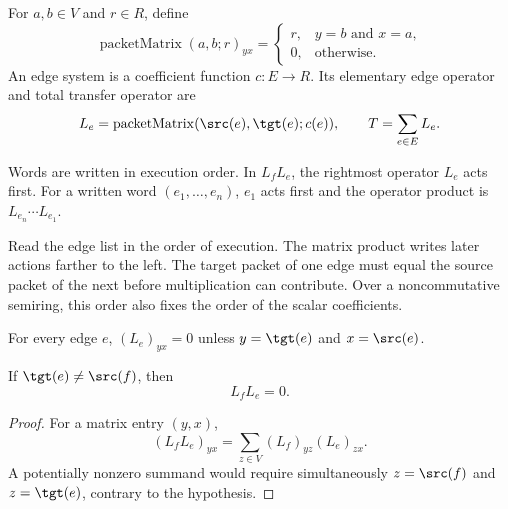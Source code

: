 \begin{definition}
\label{def:edge-system}
For $a,b\in V$ and $r\in R$, define
\[
  \operatorname{packetMatrix}(a,b;r)_{yx}
  =
  \begin{cases}
  r,&y=b\text{ and }x=a,\\
  0,&\text{otherwise}.
  \end{cases}
\]
An edge system is a coefficient function $c:E\to R$.  Its elementary edge
operator and total transfer operator are
\[
  L_e=\operatorname{packetMatrix}(\src(e),\tgt(e);c(e)),
  \qquad
  T=\sum_{e\in E}L_e.
\]
\end{definition}

Words are written in execution order. In $L_fL_e$, the rightmost operator
$L_e$ acts first. For a written word $(e_1,\ldots,e_n)$, $e_1$ acts first
and the operator product is $L_{e_n}\cdots L_{e_1}$.

\begin{keyidea}[title={Reading the execution order}]
Read the edge list in the order of execution. The matrix product writes later
actions farther to the left. The target packet of one edge must equal the
source packet of the next before multiplication can contribute. Over a noncommutative
semiring, this order also fixes the order of the scalar coefficients.
\end{keyidea}

\begin{lemma}
\label{lem:edge-support}
For every edge $e$, $(L_e)_{yx}=0$ unless
$y=\tgt(e)$ and $x=\src(e)$.
\end{lemma}

\begin{theorem}
\label{thm:edge-annihilation}
If $\tgt(e)\ne\src(f)$, then
\[
  L_fL_e=0.
\]
\end{theorem}

\begin{proof}
For a matrix entry $(y,x)$,
\[
  (L_fL_e)_{yx}=\sum_{z\in V}(L_f)_{yz}(L_e)_{zx}.
\]
A potentially nonzero summand would require simultaneously
$z=\src(f)$ and $z=\tgt(e)$, contrary to the hypothesis.
\end{proof}

